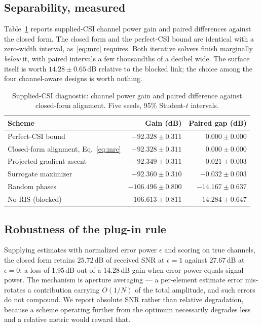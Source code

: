 \documentclass[journal]{IEEEtran}
\newcommand{\dB}{\,dB\xspace}
\begin{document}
\subsection{Separability, measured}
Table~\ref{tab:sep} reports supplied-CSI channel power gain and paired differences against the closed form. The closed form and the perfect-CSI bound are identical with a zero-width interval, as~\eqref{eq:mrc} requires. Both iterative solvers finish marginally \emph{below} it, with paired intervals a few thousandths of a decibel wide. The surface itself is worth $14.28\pm0.65$\dB relative to the blocked link; the choice among the four channel-aware designs is worth nothing.

\begin{table}[!t]
\centering
\caption{Supplied-CSI diagnostic: channel power gain and paired difference against closed-form alignment. Five seeds, 95\% Student-$t$ intervals.}
\label{tab:sep}
\renewcommand{\arraystretch}{1.15}
\setlength{\tabcolsep}{4pt}
\footnotesize
\begin{tabular}{@{}lrr@{}}
\toprule
\textbf{Scheme} & \textbf{Gain (dB)} & \textbf{Paired gap (dB)} \\
\midrule
Perfect-CSI bound            & $-92.328\pm0.311$  & $\phantom{-}0.000\pm0.000$ \\
Closed-form alignment, Eq.~\eqref{eq:mrc} & $-92.328\pm0.311$ & $\phantom{-}0.000\pm0.000$ \\
Projected gradient ascent    & $-92.349\pm0.311$  & $-0.021\pm0.003$ \\
Surrogate maximizer          & $-92.360\pm0.310$  & $-0.032\pm0.003$ \\
Random phases                & $-106.496\pm0.800$ & $-14.167\pm0.637$ \\
No RIS (blocked)             & $-106.613\pm0.811$ & $-14.284\pm0.647$ \\
\bottomrule
\end{tabular}
\end{table}

\subsection{Robustness of the plug-in rule}
Supplying estimates with normalized error power $\epsilon$ and scoring on true channels, the closed form retains $25.72$\dB of received SNR at $\epsilon=1$ against $27.67$\dB at $\epsilon=0$: a loss of 1.95\dB out of a 14.28\dB gain when error power equals signal power. The mechanism is aperture averaging --- a per-element estimate error mis-rotates a contribution carrying $O(1/N)$ of the total amplitude, and such errors do not compound. We report absolute SNR rather than relative degradation, because a scheme operating further from the optimum necessarily degrades less and a relative metric would reward that.
\end{document}
